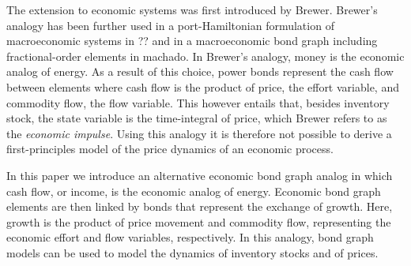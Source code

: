 The extension to economic systems was first introduced by Brewer.
Brewer's analogy has been further used in a port-Hamiltonian formulation of macroeconomic systems in ?? and in a macroeconomic bond graph including fractional-order elements in machado.
In Brewer's analogy, money is the economic analog of energy.
As a result of this choice, power bonds represent the cash flow between elements where cash flow is the product of price, the effort variable, and commodity flow, the flow variable.
This however entails that, besides inventory stock, the state variable is the time-integral of price, which Brewer refers to as the \textit{economic impulse}.
Using this analogy it is therefore not possible to derive a first-principles model of the price dynamics of an economic process.

In this paper we introduce an alternative economic bond graph analog in which cash flow, or income, is the economic analog of energy.
Economic bond graph elements are then linked by bonds that represent the exchange of growth.
Here, growth is the product of price movement and commodity flow, representing the economic effort and flow variables, respectively.
In this analogy, bond graph models can be used to model the dynamics of inventory stocks and of prices.



















\begin{comment}
In dynamical systems theory, the time evolution of the system is derived from its current state.
For example, the time evolution of mechanical system can be derived from its current state variables through Newton's equations of motion and that of an electrical system through Maxwell's equations.
For the time evolution of commodity markets, we will use an analogy between engineering and economic systems that results in the equations of motion of economic processes.
This economic-engineering analogy has been developed by the <third> author of this paper and will be presented in detail in future work.
In the present section, we introduce the concepts from the economic-engineering analogy that are relevant for the contribution made in this paper.
We first introduce the description of a commodity market as a dynamical system and then introduce the analogy between mechanical elements and economic phenomena.
\end{comment}

